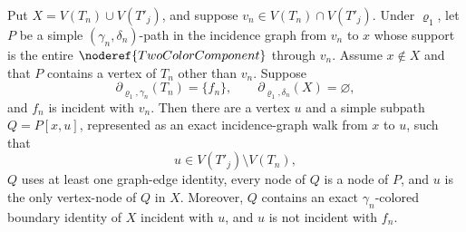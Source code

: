 \begin{lemma}
Put \(X=V(T_n)\cup V(T'_j)\), and suppose
\(v_n\in V(T_n)\cap V(T'_j)\).  Under \(\varrho_1\), let \(P\) be a
simple \((\gamma_n,\delta_n)\)-path in the incidence graph from \(v_n\)
to \(x\) whose support is the entire
\(\noderef{TwoColorComponent}\) through \(v_n\).  Assume \(x\notin X\)
and that \(P\) contains a vertex of \(T_n\) other than \(v_n\).  Suppose
\[
 \partial_{\varrho_1,\gamma_n}(T_n)=\{f_n\},\qquad
 \partial_{\varrho_1,\delta_n}(X)=\varnothing,                 \tag{20}
\]
and \(f_n\) is incident with \(v_n\).  Then there are a vertex \(u\) and
a simple subpath \(Q=P[x,u]\), represented as an exact incidence-graph
walk from \(x\) to \(u\), such that
\[
 u\in V(T'_j)\setminus V(T_n),                                 \tag{21}
\]
\(Q\) uses at least one graph-edge identity, every node of \(Q\) is a
node of \(P\), and \(u\) is the only vertex-node of \(Q\) in \(X\).
Moreover, \(Q\) contains an exact \(\gamma_n\)-colored boundary identity
of \(X\) incident with \(u\), and \(u\) is not incident with \(f_n\).
\end{lemma}
